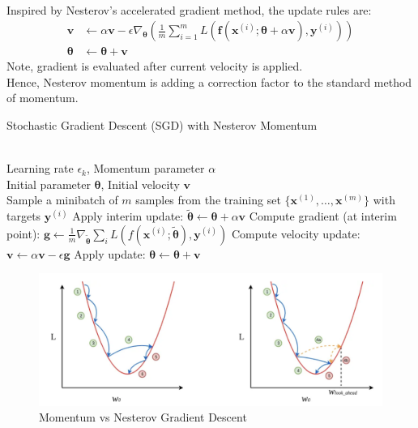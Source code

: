 \begin{remark} \\
Inspired by Nesterov's accelerated gradient method, the update rules are:
\begin{align}
\bm{v} &\leftarrow \alpha \bm{v} - \epsilon \nabla_{\bm{\theta}} \left(\frac{1}{m} \sum\limits_{i=1}^m L(\bm{f}(\bm{x}^{(i)}; \bm{\theta} + \alpha \bm{v}), \bm{y}^{(i)}) \right) \nonumber \\
\bm{\theta} &\leftarrow \bm{\theta} + \bm{v} \nonumber
\end{align}
Note, gradient is evaluated after current velocity is applied.\\
Hence, Nesterov momentum is adding a correction factor to the standard method of momentum.
\end{remark}

\begin{breakablealgorithm}
\caption{Stochastic Gradient Descent (SGD) with Nesterov Momentum}
\begin{algorithmic}
\Require \\
Learning rate $\epsilon_k$, Momentum parameter $\alpha$\\
Initial parameter $\bm{\theta}$, Initial velocity $\bm{v}$\\

\State Sample a minibatch of $m$ samples from the training set $\{\bm{x}^{(1)}, \ldots, \bm{x}^{(m)} \}$ with targets $\bm{y}^{(i)}$
\State Apply interim update: $\tilde{\bm{\theta}} \leftarrow \bm{\theta} + \alpha \bm{v}$
\State Compute gradient (at interim point): $\bm{g} \leftarrow \frac{1}{m} \nabla_{\tilde{\bm{\theta}}} \sum_{i} L(f(\bm{x}^{(i)}; \tilde{\bm{\theta}}), \bm{y}^{(i)})$
\State Compute velocity update: $\bm{v} \leftarrow \alpha \bm{v} - \epsilon \bm{g}$
\State Apply update: $\bm{\theta} \leftarrow \bm{\theta} + \bm{v}$
\EndWhile
\end{algorithmic}
\end{breakablealgorithm}

\begin{figure}[H]
\centering
\includegraphics[scale=0.4]{figures/math/nesterov}
\caption{Momentum vs Nesterov Gradient Descent}
\end{figure}

